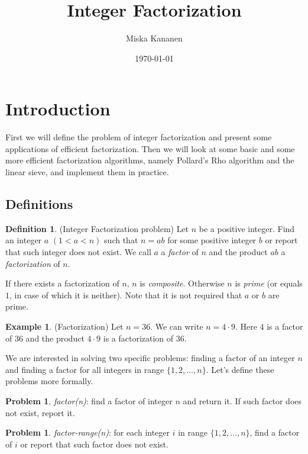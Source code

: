 \documentclass[12pt] {article}
\theoremstyle{plain}
\theoremstyle{definition}
\newtheorem{defn}[thm]{Definition}
\newtheorem{exmp}[thm]{Example}
\newtheorem{prob}[thm]{Problem}
\begin{document}
\title {Integer Factorization}
\author {Miska Kananen}
\date {\today}
\maketitle

\tableofcontents

\section {Introduction}

First we will define the problem of integer factorization and present some applications of efficient factorization. Then we will look at some basic and some more efficient factorization algorithms, namely Pollard's Rho algorithm and the linear sieve, and implement them in practice.

\subsection {Definitions}

\begin{defn} (Integer Factorization problem)
Let $n$ be a positive integer. Find an integer $a$ $(1 < a < n)$ such that $n = ab$ for some positive integer $b$ or report that such integer does not exist. We call $a$ a \textit{factor} of $n$ and the product $ab$ a \textit{factorization} of $n$.
\end{defn}

If there exists a factorization of $n$, $n$ is \textit{composite}. Otherwise $n$ is \textit{prime} (or equals $1$, in case of which it is neither). Note that it is not required that $a$ or $b$ are prime.

\begin{exmp} (Factorization)
Let $n = 36$. We can write $n = 4 \cdot 9$. Here $4$ is a factor of $36$ and the product $4 \cdot 9$ is a factorization of $36$.
\end{exmp}

We are interested in solving two specific problems: finding a factor of an integer $n$ and finding a factor for all integers in range $\{1, 2, \dots, n\}$. Let's define these problems more formally.

\begin{prob}
\textit{factor(n)}: find a factor of integer $n$ and return it. If such factor does not exist, report it.
\end{prob}

\begin{prob}
\textit{factor-range(n)}: for each integer $i$ in range $\{1, 2, \dots, n\}$, find a factor of $i$ or report that such factor does not exist.
\end{prob}
\end{document}

